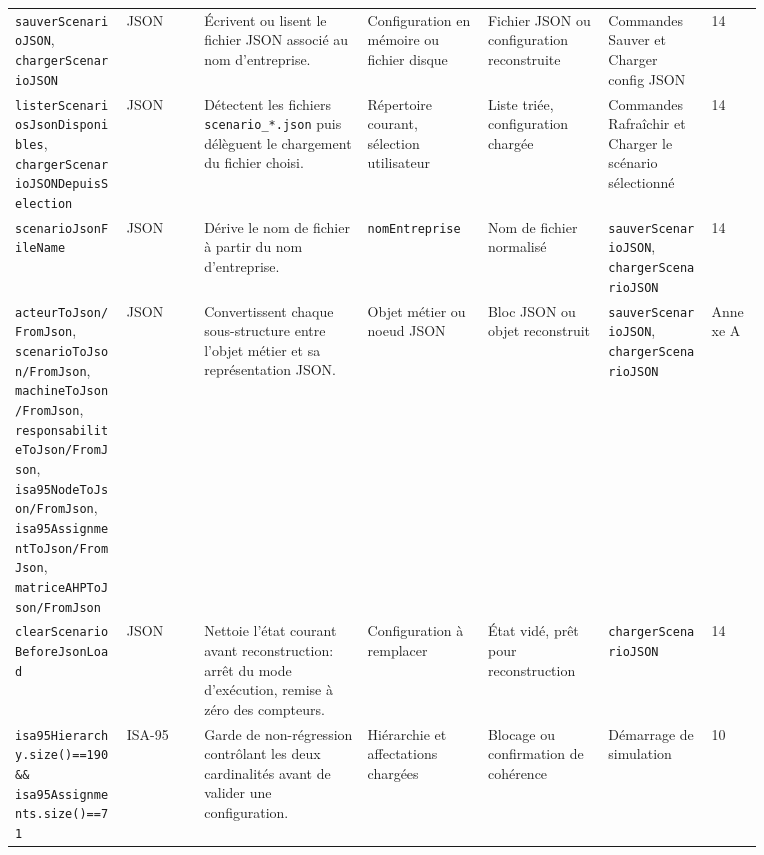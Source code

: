 \begin{landscape}
{\begin{longtable}{L{0.13\linewidth} L{0.09\linewidth} L{0.19\linewidth} L{0.14\linewidth} L{0.14\linewidth} L{0.12\linewidth} L{0.06\linewidth}}
\texttt{sauver\allowbreak Scenario\allowbreak JSON}, \texttt{charger\allowbreak Scenario\allowbreak JSON} & JSON & Écrivent ou lisent le fichier JSON associé au nom d'entreprise. & Configuration en mémoire ou fichier disque & Fichier JSON ou configuration reconstruite & Commandes Sauver et Charger config JSON & 14 \\
\texttt{lister\allowbreak Scenarios\allowbreak Json\allowbreak Disponibles}, \texttt{charger\allowbreak Scenario\allowbreak JSONDepuis\allowbreak Selection} & JSON & Détectent les fichiers \texttt{scenario\_*.json} puis délèguent le chargement du fichier choisi. & Répertoire courant, sélection utilisateur & Liste triée, configuration chargée & Commandes Rafraîchir et Charger le scénario sélectionné & 14 \\
\texttt{scenario\allowbreak Json\allowbreak File\allowbreak Name} & JSON & Dérive le nom de fichier à partir du nom d'entreprise. & \texttt{nom\allowbreak Entreprise} & Nom de fichier normalisé & \texttt{sauver\allowbreak Scenario\allowbreak JSON}, \texttt{charger\allowbreak Scenario\allowbreak JSON} & 14 \\
\texttt{acteur\allowbreak To\allowbreak Json/From\allowbreak Json}, \texttt{scenario\allowbreak To\allowbreak Json/From\allowbreak Json}, \texttt{machine\allowbreak To\allowbreak Json/From\allowbreak Json}, \texttt{responsabilite\allowbreak To\allowbreak Json/From\allowbreak Json}, \texttt{isa95\allowbreak Node\allowbreak To\allowbreak Json/From\allowbreak Json}, \texttt{isa95\allowbreak Assignment\allowbreak To\allowbreak Json/From\allowbreak Json}, \texttt{matrice\allowbreak AHPTo\allowbreak Json/From\allowbreak Json} & JSON & Convertissent chaque sous-structure entre l'objet métier et sa représentation JSON. & Objet métier ou noeud JSON & Bloc JSON ou objet reconstruit & \texttt{sauver\allowbreak Scenario\allowbreak JSON}, \texttt{charger\allowbreak Scenario\allowbreak JSON} & Annexe A \\
\texttt{clear\allowbreak Scenario\allowbreak Before\allowbreak Json\allowbreak Load} & JSON & Nettoie l'état courant avant reconstruction: arrêt du mode d'exécution, remise à zéro des compteurs. & Configuration à remplacer & État vidé, prêt pour reconstruction & \texttt{charger\allowbreak Scenario\allowbreak JSON} & 14 \\

\texttt{isa95\allowbreak Hierarchy.size()==190 \&\& isa95\allowbreak Assignments.size()==71} & ISA-95 & Garde de non-régression contrôlant les deux cardinalités avant de valider une configuration. & Hiérarchie et affectations chargées & Blocage ou confirmation de cohérence & Démarrage de simulation & 10 \\


\end{longtable}}
\end{landscape}
